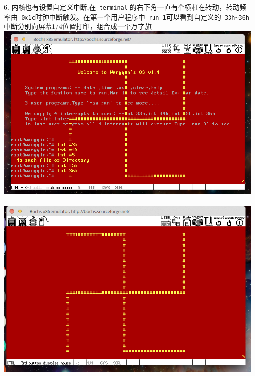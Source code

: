 \documentclass[a4paper]{article}
\begin{document}
{6. 内核也有设置自定义中断,在\verb| terminal| 的右下角一直有个横杠在转动，转动频率由\verb| 0x1c|时钟中断触发。在第一个用户程序中\verb| run 1|可以看到自定义的\verb| 33h~36h|中断分别向屏幕1/4位置打印，组合成一个万字旗
{\center\includegraphics[scale=0.45]{Illustrations/allcustomint.png}}\\\\
{\center\includegraphics[scale=0.45]{Illustrations/usr2.png}}\\\\

}
\end{document}
